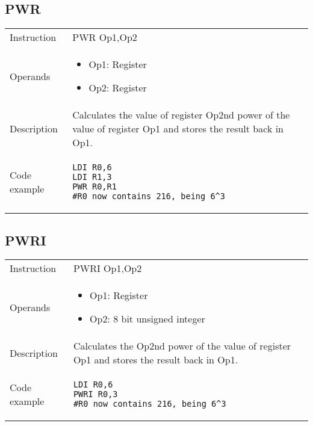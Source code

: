 \subsection{PWR}
\renewcommand*{\arraystretch}{2.0}
\begin{longtable}{P{3cm}P{9cm}}
\midrule
\noindent Instruction & PWR Op1,Op2 \\
\noindent Operands &
\begin{itemize}[label={},noitemsep,leftmargin=*,topsep=0pt,partopsep=0pt, itemsep=1em]
\item Op1: Register
\item Op2: Register
\end{itemize}\\
\noindent Description & Calculates the value of register Op2nd power of the value of register Op1 and stores the result back in Op1.
	 \\
\noindent Code example & 
\begin{lstlisting}
LDI R0,6
LDI R1,3
PWR R0,R1
#R0 now contains 216, being 6^3
\end{lstlisting} \\
\end{longtable}


\subsection{PWRI}
\renewcommand*{\arraystretch}{2.0}
\begin{longtable}{P{3cm}P{9cm}}
\midrule
\noindent Instruction & PWRI Op1,Op2 \\
\noindent Operands &
\begin{itemize}[label={},noitemsep,leftmargin=*,topsep=0pt,partopsep=0pt, itemsep=1em]
\item Op1: Register
\item Op2: 8 bit unsigned integer
\end{itemize}\\
\noindent Description & Calculates the Op2nd power of the value of register Op1 and stores the result back in Op1.
	 \\
\noindent Code example & 
\begin{lstlisting}
LDI R0,6
PWRI R0,3
#R0 now contains 216, being 6^3
\end{lstlisting} \\
\end{longtable}

\newpage

